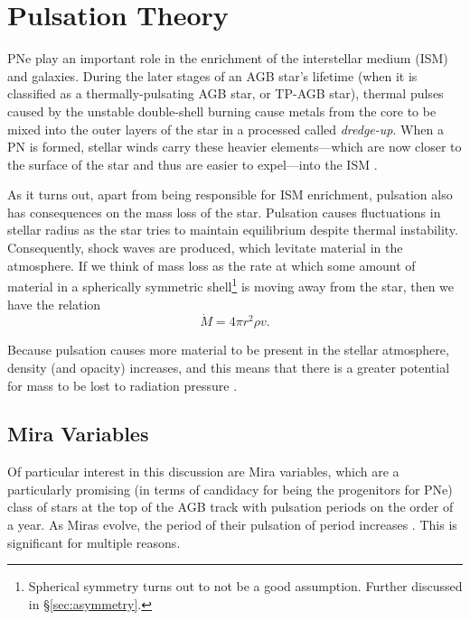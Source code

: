 \documentclass[twocolumn]{aastex63}
\begin{document}

\section{Pulsation Theory} \label{sec:pulsation}
PNe play an important role in the enrichment of the interstellar medium (ISM) and galaxies. During the later stages of an AGB star's lifetime (when it is classified as a thermally-pulsating AGB star, or TP-AGB star), thermal pulses caused by the unstable double-shell burning cause metals from the core to be mixed into the outer layers of the star in a processed called \textit{dredge-up}. When a PN is formed, stellar winds carry these heavier elements—which are now closer to the surface of the star and thus are easier to expel—into the ISM \citep{iben}. 

As it turns out, apart from being responsible for ISM enrichment, pulsation also has consequences on the mass loss of the star. Pulsation causes fluctuations in stellar radius as the star tries to maintain equilibrium despite thermal instability. Consequently, shock waves are produced, which levitate material in the atmosphere. If we think of mass loss as the rate at which some amount of material in a spherically symmetric shell\footnote{Spherical symmetry turns out to not be a good assumption. Further discussed in \S \ref{sec:asymmetry}.} is moving away from the star, then we have the relation
\begin{equation*}
    \dot M = 4\pi r^2 \rho v.
\end{equation*}

Because pulsation causes more material to be present in the stellar atmosphere, density (and opacity) increases, and this means that there is a greater potential for mass to be lost to radiation pressure \citep{liljegren}. 

\subsection{Mira Variables} \label{subsec:mira}

Of particular interest in this discussion are Mira variables, which are a particularly promising (in terms of candidacy for being the progenitors for PNe) class of stars at the top of the AGB track with pulsation periods on the order of a year. As Miras evolve, the period of their pulsation of period increases \citep{fadeyev}. This is significant for multiple reasons. 
\end{document}
